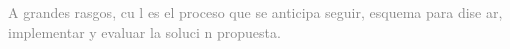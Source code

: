\documentclass{article}
\begin{document}
\noindent \textcolor{gray}{A  grandes  rasgos,  cu l  es  el  proceso  que  se  anticipa  seguir, esquema  para  dise ar,  implementar  y  evaluar  la  soluci n  propuesta.}
%
%
\end{document}

